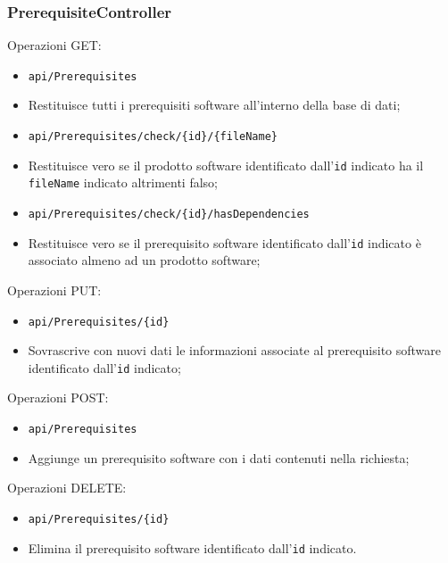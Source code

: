 \documentclass[../RelazioneFinale.tex]{subfiles}
\begin{document}
			\subsubsection{PrerequisiteController}
			\begin{description}
				\item Operazioni GET:
				\begin{itemize}
					\item \verb|api/Prerequisites|
					\item[] Restituisce tutti i prerequisiti software all'interno della base di dati;
					\item \verb|api/Prerequisites/check/{id}/{fileName}|
					\item[] Restituisce vero se il prodotto software identificato dall'\verb|id| indicato ha il \verb|fileName| indicato altrimenti falso;
					\item \verb|api/Prerequisites/check/{id}/hasDependencies|
					\item[] Restituisce vero se il prerequisito software identificato dall'\verb|id| indicato è associato almeno ad un prodotto software;
									
				\end{itemize}
				
				\item Operazioni PUT:
				\begin{itemize}
					\item \verb|api/Prerequisites/{id}| 
					\item[] Sovrascrive con nuovi dati le informazioni associate al prerequisito software identificato dall'\verb|id| indicato;
				\end{itemize}								
	
				\item Operazioni POST:
				\begin{itemize}
					\item \verb|api/Prerequisites|
					\item[] Aggiunge un prerequisito software con i dati contenuti nella richiesta;
				\end{itemize}				
				
				\item Operazioni DELETE:
				\begin{itemize}
					\item \verb|api/Prerequisites/{id}|
					\item[] Elimina il prerequisito software identificato dall'\verb|id| indicato.
				\end{itemize}
				
			\end{description}
\end{document}
